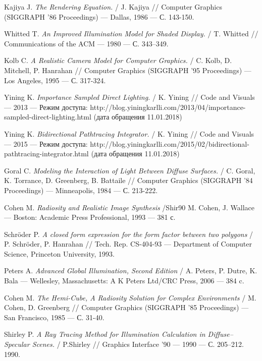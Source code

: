 \documentclass[12pt]{article}
\begin{document}
\newpage
\begin{thebibliography}{9} %
Kajiya J.
\textit{The Rendering Equation.} / 
J. Kajiya //
Computer Graphics (SIGGRAPH ’86 Proceedings) --- Dallas, 1986 --- С. 143-150.

Whitted T.
\textit{An Improved Illumination Model for Shaded Display.} / 
T. Whitted //
Communications of the ACM --- 1980 --- С. 343–349.

Kolb C.
\textit{A Realistic Camera Model for Computer Graphics.} /
C. Kolb, D. Mitchell, P. Hanrahan //
Computer Graphics (SIGGRAPH ’95 Proceedings) --- Los Angeles, 1995 --- С. 317-324.

Yining K.
\textit{Importance Sampled Direct Lighting.} / 
K. Yining //
Code and Visuals --- 2013 --- Режим доступа: http://blog.yiningkarlli.com/2013/04/importance-sampled-direct-lighting.html (дата обращения 11.01.2018)

Yining K.
\textit{Bidirectional Pathtracing Integrator.} / 
K. Yining //
Code and Visuals --- 2015 --- Режим доступа: http://blog.yiningkarlli.com/2015/02/bidirectional-pathtracing-integrator.html (дата обращения 11.01.2018)

Goral C.
\textit{Modeling the Interaction of Light Between Diffuse Surfaces.} /
C. Goral, K. Torrance, D. Greenberg, B. Battaile //
Computer Graphics (SIGGRAPH ’84 Proceedings) --- Minneapolis, 1984 --- С. 213-222.

Cohen M.
\textit{Radiosity and Realistic Image Synthesis} /Shir90
M. Cohen, J. Wallace
--- Boston: Academic Press Professional, 1993 --- 381 с.

Schr{\"o}der P.
\textit{A closed form expression for the form factor between two polygons} /
P. Schr{\"o}der, P. Hanrahan //
Tech. Rep. CS-404-93 --- Department of Computer Science, Princeton University, 1993.

Peters A.
\textit{Advanced Global Illumination, Second Edition} /
A. Peters, P. Dutre, K. Bala
--- Wellesley, Massachusetts: A K Peters Ltd/CRC Press, 2006 --- 384 c.

Cohen M.
\textit{The Hemi-Cube, A Radiosity Solution for Complex Environments} /
M. Cohen, D. Greenberg //
Computer Graphics (SIGGRAPH ’85 Proceedings) --- San Francisco, 1985 --- С. 31-40.

Shirley P.
\textit{A Ray Tracing Method for Illumination Calculation in Diffuse–Specular Scenes.} /
P.Shirley //
Graphics Interface '90 --- 1990 --- С. 205–212.
1990.


\end{thebibliography}
\end{document}
